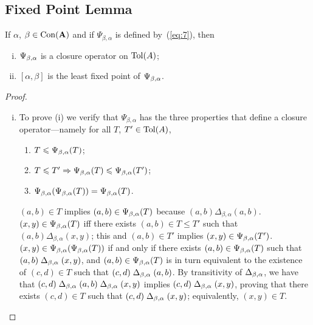 \subsection{Fixed Point Lemma}
\begin{lemma}
  \label{lem:fixed-point-comm}
  If $\alpha$, $\beta\in \operatorname{Con}(\mathbf{A})$ and 
  if $\Psi_{\beta, \alpha}$ is defined by~(\ref{eq:7}), then 
  \begin{enumerate}[(i)]
  \item \label{item:1} $\Psi_{\beta, \alpha}$ is a closure operator on $\operatorname{Tol}(A)$;
  \item \label{item:2} $[\alpha, \beta]$ is the least fixed point of $\Psi_{\beta, \alpha}$.
  \end{enumerate}
\end{lemma}
\begin{proof}\
  \begin{enumerate}[(i)]
  \item 
    To prove (i) we verify that
    $\Psi_{\beta, \alpha}$ has the three properties that define a closure
    operator---namely for all $T$, $T' \in \operatorname{Tol}(A)$,
  \begin{enumerate}[(c.1)]
  \item \label{item:c1} $T  \leqslant \Psi_{\beta, \alpha}(T )$;     
  \item \label{item:c2} $T  \leqslant T'  \Rightarrow \Psi_{\beta, \alpha}(T) \leqslant \Psi_{\beta, \alpha}(T')$;    
  \item \label{item:c3} $\Psi_{\beta, \alpha}(\Psi_{\beta, \alpha}(T))  = \Psi_{\beta, \alpha}(T)$. 
  \end{enumerate}

  \vskip2mm

   $(a,b) \in T $
  implies $(a,b) \in \Psi_{\beta, \alpha}(T )$ because $(a,b)\mathrel{\Delta_{\beta, \alpha}} (a,b)$.\\[4pt]
   $(x,y) \in \Psi_{\beta, \alpha}(T )$ iff there exists
  $(a,b) \in T  \leq T'$ such that
  $(a,b) \mathrel{\Delta_{\beta, \alpha}} (x,y)$; this and $(a,b) \in T'$ implies
  $(x,y) \in \Psi_{\beta, \alpha}(T')$.\\[4pt]
   $(x,y) \in \Psi_{\beta, \alpha}(\Psi_{\beta, \alpha}(T))$ if and only if
  there exists $(a,b) \in \Psi_{\beta, \alpha}(T)$ such that
  $(a,b) \mathrel{\Delta_{\beta, \alpha}} (x,y)$, and $(a,b) \in \Psi_{\beta, \alpha}(T)$ is in turn equivalent to 
  the existence of $(c,d) \in T $ such that
  $(c,d) \mathrel{\Delta_{\beta, \alpha}} (a,b)$. By transitivity of $\Delta_{\beta, \alpha}$, we have that
  $(c,d) \mathrel{\Delta_{\beta, \alpha}} (a,b) \mathrel{\Delta_{\beta, \alpha}} (x,y)$ implies
  $(c,d) \mathrel{\Delta_{\beta, \alpha}} (x,y)$, proving that there exists $(c,d) \in T $ such that
  $(c,d) \mathrel{\Delta_{\beta, \alpha}} (x,y)$; equivalently, $(x,y) \in T $.


\end{enumerate}
\end{proof}
